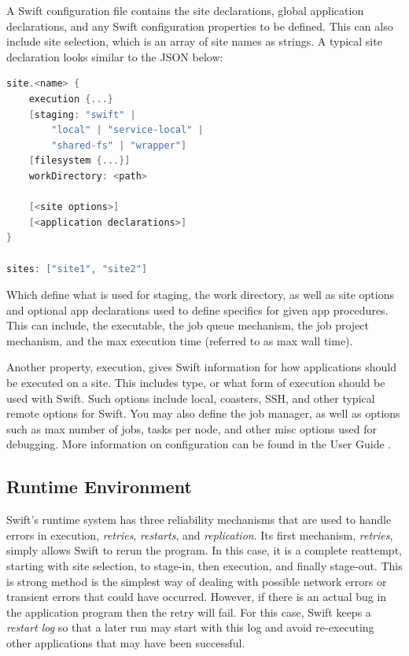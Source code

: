     A Swift configuration file contains the site declarations, global application declarations, and any Swift configuration properties to be defined. This can also include site selection, which is an array of site names as strings. A typical site declaration looks similar to the JSON below:
    \begin{lstlisting}[language=swift]
site.<name> {
    execution {...}
    [staging: "swift" |
        "local" | "service-local" |
        "shared-fs" | "wrapper"]
    [filesystem {...}]
    workDirectory: <path>

    [<site options>]
    [<application declarations>]
}

sites: ["site1", "site2"]
    \end{lstlisting}
    Which define what is used for staging, the work directory, as well as site options and optional app declarations used to define specifics for given app procedures. This can include, the executable, the job queue mechanism, the job project mechanism, and the max execution time (referred to as max wall time).

    Another property, execution, gives Swift information for how applications should be executed on a site. This includes type, or what form of execution should be used with Swift. Such options include local, coasters, SSH, and other typical remote options for Swift. You may also define the job manager, as well as options such as max number of jobs, tasks per node, and other misc options used for debugging. More information on configuration can be found in the User Guide \cite{website:swift-lang-user-guide}.

\subsection{Runtime Environment}

    Swift's runtime system has three reliability mechanisms that are used to handle errors in execution, \textit{retries}, \textit{restarts}, and \textit{replication}.\cite{wilde2011swift} Its first mechanism, \textit{retries}, simply allows Swift to rerun the program. In this case, it is a complete reattempt, starting with site selection, to stage-in, then execution, and finally stage-out. This is strong method is the simplest way of dealing with possible network errors or transient errors that could have occurred. However, if there is an actual bug in the application program then the retry will fail. For this case, Swift keeps a \textit{restart log} so that a later run may start with this log and avoid re-executing other applications that may have been successful.

